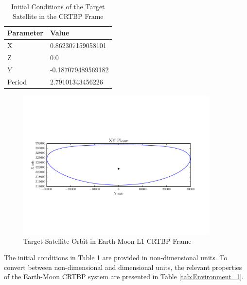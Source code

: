 \documentclass[a4paper]{article}
\begin{document}
\begin{table}[h] \label{tab:IC_1}
	\begin{center}
		\begin{tabular}{l l}
			\toprule
			Parameter   & Value \\
			\midrule
			X                & 0.862307159058101 \\
			Z                & 0.0 \\
			\(\dot{Y}\) & -0.187079489569182 \\
			Period        & 2.79101343456226 \\
			\bottomrule
		\end{tabular}
		\caption{Initial Conditions of the Target Satellite in the CRTBP Frame}
	\end{center}
\end{table}

\begin{figure}[h] \label{fig:FullOrbit_1}
	\begin{center}
		\includegraphics[width=0.9\textwidth]{Target_Full_Orbit_1}
		\caption{Target Satellite Orbit in Earth-Moon L1 CRTBP Frame}
	\end{center}
\end{figure}

The initial conditions in Table \ref{tab:IC_1} are provided in non-dimensional units.  To convert between non-dimensional and dimensional units, the relevant properties of the Earth-Moon CRTBP system are presented in Table \ref{tab:Environment_1}.
\end{document}
